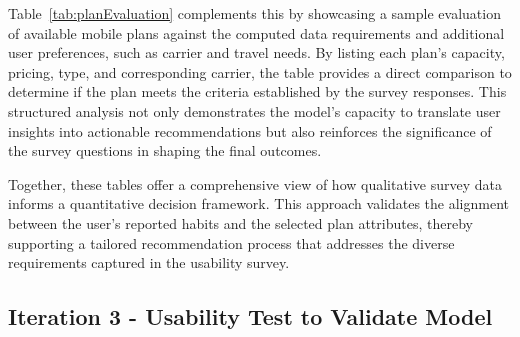 \documentclass[conference]{IEEEtran}
\begin{document}
Table~\ref{tab:planEvaluation} complements this by showcasing a sample evaluation of available mobile plans against the computed data requirements and additional user preferences, such as carrier and travel needs. By listing each plan’s capacity, pricing, type, and corresponding carrier, the table provides a direct comparison to determine if the plan meets the criteria established by the survey responses. This structured analysis not only demonstrates the model’s capacity to translate user insights into actionable recommendations but also reinforces the significance of the survey questions in shaping the final outcomes. 

Together, these tables offer a comprehensive view of how qualitative survey data informs a quantitative decision framework. This approach validates the alignment between the user’s reported habits and the selected plan attributes, thereby supporting a tailored recommendation process that addresses the diverse requirements captured in the usability survey.




\subsection{Iteration 3 - Usability Test to Validate Model}
\end{document}
